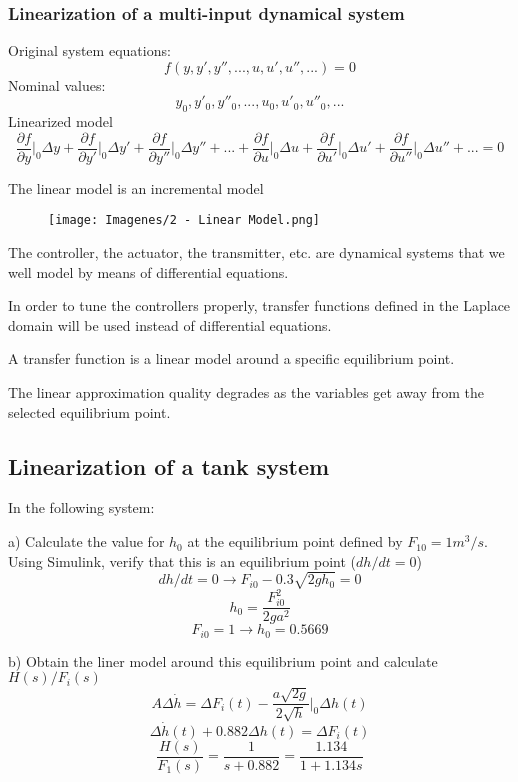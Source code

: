 \subsubsection{Linearization of a multi-input dynamical system}
Original system equations:
\[f(y, y', y'',..., u, u', u'',...) = 0\]
Nominal values:
\[y_0, y'_0, y''_0,..., u_0, u'_0, u''_0, ...\]
Linearized model
\[\frac{\partial f}{\partial y} \bigg|_0 \Delta y + \frac{\partial f}{\partial y'} \bigg|_0 \Delta y' + \frac{\partial f}{\partial y''} \bigg|_0 \Delta y'' + ... + \frac{\partial f}{\partial u} \bigg|_0 \Delta u + \frac{\partial f}{\partial u'} \bigg|_0 \Delta u' + \frac{\partial f}{\partial u''} \bigg|_0 \Delta u'' + ... = 0\]

The linear model is an incremental model
\begin{figure}[H]
    \centering
    \texttt{[image: Imagenes/2 - Linear Model.png]}
    \label{Fig: 2 - Linear Model}
\end{figure}

The controller, the actuator, the transmitter, etc. are dynamical systems that we well model by means of differential equations.

In order to tune the controllers properly, transfer functions defined in the Laplace domain will be used instead of differential equations.

A transfer function is a linear model around a specific equilibrium point.

The linear approximation quality degrades as the variables get away from the selected equilibrium point.

\subsection{Linearization of a tank system}
In the following system:

a) Calculate the value for $h_0$ at the equilibrium point defined by $F_{10} = 1 m^3 / s$. Using Simulink, verify that this is an equilibrium point ($dh/dt = 0$)
\[dh/dt = 0 \rightarrow F_{i0} - 0.3 \sqrt{2 g h_0} = 0\]
\[h_0 = \frac{F_{i0}^2}{2ga^2}\]
\[F_{i0} = 1 \rightarrow h_0 = 0.5669\]

b) Obtain the liner model around this equilibrium point and calculate $H(s) / F_i(s)$
\[A \Delta \dot{h} = \Delta F_i (t) - \frac{a \sqrt{2g}}{2\sqrt{h}} \bigg|_0 \Delta h(t)\]
\[\Delta \dot{h}(t) + 0.882 \Delta h(t) = \Delta F_i (t) \]
\[\frac{H(s)}{F_1(s)} = \frac{1}{s + 0.882} = \frac{1.134}{1 + 1.134 s}\]

